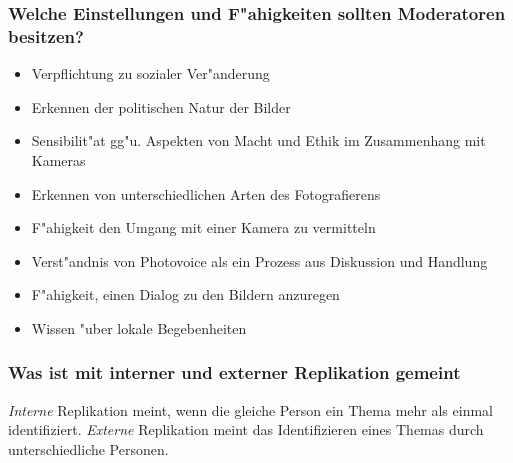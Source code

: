 \subsubsection{Welche Einstellungen und F"ahigkeiten sollten Moderatoren besitzen?}
\begin{itemize}
        \item Verpflichtung zu sozialer Ver"anderung
        \item Erkennen der politischen Natur der Bilder
        \item Sensibilit"at gg"u. Aspekten von Macht und Ethik im Zusammenhang mit Kameras
        \item Erkennen von unterschiedlichen Arten des Fotografierens
        \item F"ahigkeit den Umgang mit einer Kamera zu vermitteln
        \item Verst"andnis von Photovoice als ein Prozess aus Diskussion und Handlung
        \item F"ahigkeit, einen Dialog zu den Bildern anzuregen
        \item Wissen "uber lokale Begebenheiten
\end{itemize}

\subsubsection{Was ist mit interner und externer Replikation gemeint}
\emph{Interne} Replikation meint, wenn die gleiche Person ein Thema mehr als einmal identifiziert. \emph{Externe} Replikation meint das Identifizieren eines Themas durch unterschiedliche Personen.
